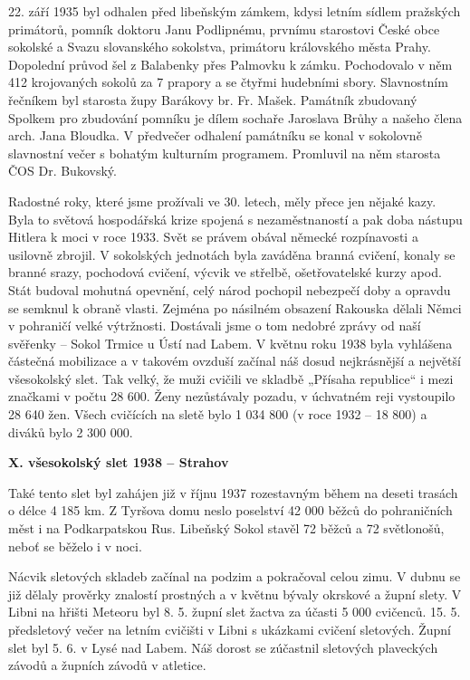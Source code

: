 22. září 1935 byl odhalen před libeňským zámkem, kdysi letním sídlem
pražských primátorů, pomník doktoru Janu Podlipnému, prvnímu starostovi
České obce sokolské a Svazu slovanského sokolstva, primátoru královského
města Prahy. Dopolední průvod šel z Balabenky přes Palmovku k zámku.
Pochodovalo v něm 412 krojovaných sokolů za 7 prapory a se čtyřmi
hudebními sbory. Slavnostním řečníkem byl starosta župy Barákovy br. Fr.
Mašek. Památník zbudovaný Spolkem pro zbudování pomníku je dílem sochaře
Jaroslava Brůhy a našeho člena arch. Jana Bloudka. V předvečer odhalení
památníku se konal v sokolovně slavnostní večer s bohatým kulturním
programem. Promluvil na něm starosta ČOS Dr. Bukovský.

Radostné roky, které jsme prožívali ve 30. letech, měly přece jen nějaké
kazy. Byla to světová hospodářská krize spojená s nezaměstnaností a pak
doba nástupu Hitlera k moci v roce 1933. Svět se právem obával německé
rozpínavosti a usilovně zbrojil. V sokolských jednotách byla zaváděna
branná cvičení, konaly se branné srazy, pochodová cvičení, výcvik ve
střelbě, ošetřovatelské kurzy apod. Stát budoval mohutná opevnění, celý
národ pochopil nebezpečí doby a opravdu se semknul k obraně vlasti.
Zejména po násilném obsazení Rakouska dělali Němci v pohraničí velké
výtržnosti. Dostávali jsme o tom nedobré zprávy od naší svěřenky --
Sokol Trmice u Ústí nad Labem. V květnu roku 1938 byla vyhlášena
částečná mobilizace a v takovém ovzduší začínal náš dosud nejkrásnější a
největší všesokolský slet. Tak velký, že muži cvičili ve skladbě
„Přísaha republice`` i mezi značkami v počtu 28 600. Ženy nezůstávaly
pozadu, v úchvatném reji vystoupilo 28 640 žen. Všech cvičících na sletě
bylo 1 034 800 (v roce 1932 -- 18 800) a diváků bylo 2 300 000.

\textbf{X. všesokolský slet 1938 -- Strahov}

Také tento slet byl zahájen již v říjnu 1937 rozestavným během na deseti
trasách o délce 4 185 km. Z Tyršova domu neslo poselství 42 000 běžců do
pohraničních měst i na Podkarpatskou Rus. Libeňský Sokol stavěl 72 běžců
a 72 světlonošů, neboť se běželo i v noci.

Nácvik sletových skladeb začínal na podzim a pokračoval celou zimu. V
dubnu se již dělaly prověrky znalostí prostných a v květnu bývaly
okrskové a župní slety. V Libni na hřišti Meteoru byl 8. 5. župní slet
žactva za účasti 5 000 cvičenců. 15. 5. předsletový večer na letním
cvičišti v Libni s ukázkami cvičení sletových. Župní slet byl 5. 6. v
Lysé nad Labem. Náš dorost se zúčastnil sletových plaveckých závodů a
župních závodů v atletice.

